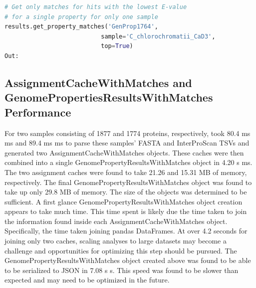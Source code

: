 \begin{lstlisting}[language=Python]  
# Get only matches for hits with the lowest E-value 
# for a single property for only one sample                                     
results.get_property_matches('GenProp1764', 
                           sample='C_chlorochromatii_CaD3',
                           top=True)
Out:
\end{lstlisting}

\begin{table}[!ht]
\centering
{}
\end{table}

\subsection{AssignmentCacheWithMatches and GenomePropertiesResultsWithMatches Performance}

For two samples consisting of 1877 and 1774 proteins, respectively, took 80.4 ms  ms and 89.4 ms  ms to parse these samples' FASTA and InterProScan TSVs and generated two AssignmentCacheWithMatches objects. These caches were then combined into a single GenomePropertyResultsWithMatches object in 4.20 s  ms.  The two assignment caches were found to take 21.26 and 15.31 MB of memory, respectively. The final GenomePropertyResultsWithMatches object was found to take up only 29.8 MB of memory. The size of the objects was determined to be sufficient. A first glance GenomePropertyResultsWithMatches object creation appears to take much time. This time spent is likely due the time taken to join the information found inside each AssignmentCacheWithMatches object. Specifically, the time taken joining pandas DataFrames. At over 4.2 seconds for joining only two caches, scaling analyses to large datasets may become a challenge and opportunities for optimizing this step should be pursued. The GenomePropertyResultsWithMatches object created above was found to be able to be serialized to JSON in 7.08 s  s. This speed was found to be slower than expected and may need to be optimized in the future.

